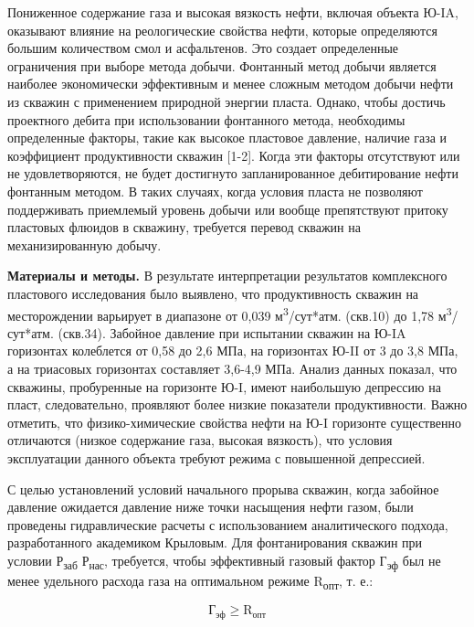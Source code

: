 \begin{multicols}{2}
Пониженное содержание газа и высокая вязкость нефти, включая объекта
Ю-IA, оказывают влияние на реологические свойства нефти, которые
определяются большим количеством смол и асфальтенов. Это создает
определенные ограничения при выборе метода добычи. Фонтанный метод
добычи является наиболее экономически эффективным и менее сложным
методом добычи нефти из скважин с применением природной энергии пласта.
Однако, чтобы достичь проектного дебита при использовании фонтанного
метода, необходимы определенные факторы, такие как высокое пластовое
давление, наличие газа и коэффициент продуктивности скважин {[}1-2{]}.
Когда эти факторы отсутствуют или не удовлетворяются, не будет
достигнуто запланированное дебитирование нефти фонтанным методом. В
таких случаях, когда условия пласта не позволяют поддерживать приемлемый
уровень добычи или вообще препятствуют притоку пластовых флюидов в
скважину, требуется перевод скважин на механизированную добычу.

{\bfseries Материалы и методы.} В результате интерпретации результатов
комплексного пластового исследования было выявлено, что продуктивность
скважин на месторождении варьирует в диапазоне от 0,039
м\textsuperscript{3}/сут*атм. (скв.10) до 1,78
м\textsuperscript{3}/сут*атм. (скв.34). Забойное давление при испытании
скважин на Ю-IA горизонтах колеблется от 0,58 до 2,6 МПа, на горизонтах
Ю-II от 3 до 3,8 МПа, а на триасовых горизонтах составляет 3,6-4,9 МПа.
Анализ данных показал, что скважины, пробуренные на горизонте Ю-I, имеют
наибольшую депрессию на пласт, следовательно, проявляют более низкие
показатели продуктивности. Важно отметить, что физико-химические
свойства нефти на Ю-I горизонте существенно отличаются (низкое
содержание газа, высокая вязкость), что условия эксплуатации данного
объекта требуют режима с повышенной депрессией.

С целью установлений условий начального прорыва скважин, когда забойное
давление ожидается давление ниже точки насыщения нефти газом, были
проведены гидравлические расчеты с использованием аналитического
подхода, разработанного академиком Крыловым. Для фонтанирования скважин
при условии Р\textsubscript{заб}  Р\textsubscript{нас},
требуется, чтобы эффективный газовый фактор Г\textsubscript{эф} был не
менее удельного расхода газа на оптимальном режиме R\textsubscript{опт},
т. е.:

\begin{equation}
\text{Г}_{\text{эф}}\ge \text{R}_{\text{опт}}
\end{equation}


\end{multicols}
